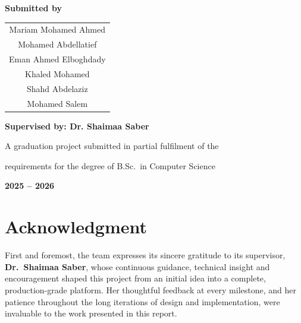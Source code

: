 \documentclass[12pt,a4paper]{report}
\newcommand{\projectYear}{2025 -- 2026}          %
\begin{document}
{\begin{center}
{\large\bfseries Submitted by \par}
\vspace{0.3cm}
{\large
\begin{tabular}{c}
Mariam Mohamed Ahmed \\[2pt]
Mohamed Abdellatief \\[2pt]
Eman Ahmed Elboghdady \\[2pt]
Khaled Mohamed \\[2pt]
Shahd Abdelaziz \\[2pt]
Mohamed Salem \\
\end{tabular}\par}

\vspace{0.8cm}

{\large\bfseries Supervised by: Dr. Shaimaa Saber \par}

\vspace{0.9cm}

{\normalsize A graduation project submitted in partial fulfilment of the \par}
{\normalsize requirements for the degree of B.Sc.\ in Computer Science \par}
\vspace{0.5cm}
{\Large\bfseries \projectYear \par}

\end{center}}
\clearpage


\chapter*{Acknowledgment}

First and foremost, the team expresses its sincere gratitude to its supervisor,
\textbf{Dr.~Shaimaa Saber}, whose continuous guidance, technical insight and
encouragement shaped this project from an initial idea into a complete,
production-grade platform. Her thoughtful feedback at every milestone, and her
patience throughout the long iterations of design and implementation, were
invaluable to the work presented in this report.
\end{document}
